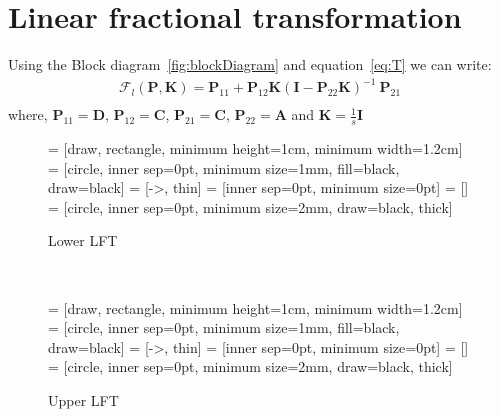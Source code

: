 \documentclass{scrreprt}
\begin{document}
\section{Linear fractional transformation}
Using the Block diagram~\ref{fig:blockDiagram} and equation~\eqref{eq:T} we can write:\\
\begin{align*}
\bm{\mathcal{F}}_l(\bm{P},\bm{K}) = \bm{P}_{11} + \bm{P}_{12}\bm{K}(\bm{I}-\bm{P}_{22}\bm{K})^{-1}\: \bm{P}_{21}\\
\end{align*}
where, $\bm{P}_{11}=\bm{D}$, $\bm{P}_{12}=\bm{C}$, $\bm{P}_{21}=\bm{C}$, $\bm{P}_{22}=\bm{A}$ and $\bm{K}=\frac{1}{s}\bm{I}$
\\
\begin{figure}[htb]
  \centering
       = [draw, rectangle, minimum height=1cm, minimum width=1.2cm]
        = [circle, inner sep=0pt, minimum size=1mm, fill=black, draw=black]
     = [->, thin]
         = [inner sep=0pt, minimum size=0pt]
         = []
           = [circle, inner sep=0pt, minimum size=2mm, draw=black, thick]
	  \caption{Lower LFT}
    \label{fig:LFT1}
\end{figure} \\
\begin{figure}[htb]
  \centering
       = [draw, rectangle, minimum height=1cm, minimum width=1.2cm]
        = [circle, inner sep=0pt, minimum size=1mm, fill=black, draw=black]
     = [->, thin]
         = [inner sep=0pt, minimum size=0pt]
         = []
           = [circle, inner sep=0pt, minimum size=2mm, draw=black, thick]
	  \caption{Upper LFT}
    \label{fig:LFT2}
\end{figure} \\
\end{document}
